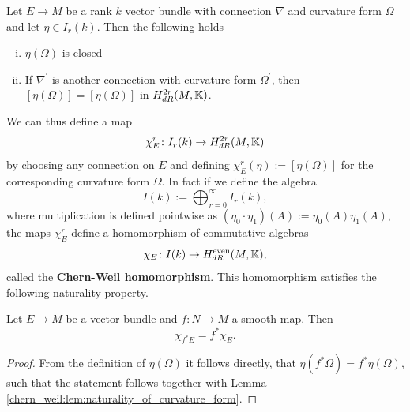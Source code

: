 \begin{theorem}
    \label{chern_weil:thm:chern_weil_thm}
    Let $E \to M$ be a rank $k$ vector bundle with connection $\nabla$ and curvature form $\Omega$ and let $\eta \in I_r(k)$. Then the following holds 
    \begin{enumerate}[(i)]
        \item $\eta(\Omega)$ is closed 
        \item If $\nabla^\prime$ is another connection with curvature form $\Omega^\prime$, then $[\eta(\Omega)] = [\eta(\Omega)]$
        in $H_{dR}^{2r}(M,\mathbb{K})$.
    \end{enumerate}
\end{theorem}

We can thus define a map 
\[
\chi_E^r \colon I_r(k) \to H_{dR}^{2r}(M,\mathbb{K})
\]
by choosing any connection on $E$ and defining $\chi_E^r(\eta) := [\eta(\Omega)]$ for the corresponding curvature form $\Omega$. In fact if we define the algebra 
\[
I(k) := \bigoplus_{r=0}^\infty I_r(k),
\]
where multiplication is defined pointwise as $(\eta_0 \cdot \eta_1)(A):= \eta_0(A)\eta_1(A)$, the maps $\chi_E^r$ define a homomorphism of commutative algebras
\[  
\chi_E \colon I(k) \to H_{dR}^{\text{even}}(M,\mathbb{K}),
\]
called the \textbf{Chern-Weil homomorphism}. This homomorphism satisfies the following naturality property.

\begin{corollary}
    Let $E \to M$ be a vector bundle and $f \colon N \to M$ a smooth map. Then 
    \[
    \chi_{f^\ast E} = f^\ast \chi_E.
    \]
\end{corollary}
\begin{proof}
    From the definition of $\eta(\Omega)$ it follows directly, that $\eta(f^\ast \Omega) = f^\ast\eta(\Omega)$, such that the statement follows together with Lemma \ref{chern_weil:lem:naturality_of_curvature_form}.
\end{proof}